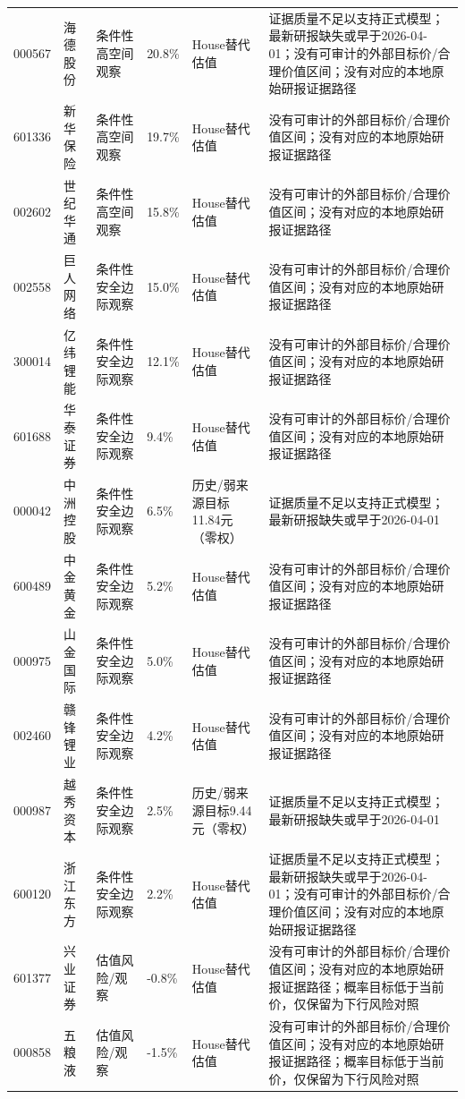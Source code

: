 \begin{longtable}{L{1.15cm}L{1.55cm}L{2.15cm}R{1.15cm}R{1.05cm}L{3.0cm}}
000567 & 海德股份 & 条件性高空间观察 & 20.8\% & House替代估值 & 证据质量不足以支持正式模型；最新研报缺失或早于2026-04-01；没有可审计的外部目标价/合理价值区间；没有对应的本地原始研报证据路径 \\
601336 & 新华保险 & 条件性高空间观察 & 19.7\% & House替代估值 & 没有可审计的外部目标价/合理价值区间；没有对应的本地原始研报证据路径 \\
002602 & 世纪华通 & 条件性高空间观察 & 15.8\% & House替代估值 & 没有可审计的外部目标价/合理价值区间；没有对应的本地原始研报证据路径 \\
002558 & 巨人网络 & 条件性安全边际观察 & 15.0\% & House替代估值 & 没有可审计的外部目标价/合理价值区间；没有对应的本地原始研报证据路径 \\
300014 & 亿纬锂能 & 条件性安全边际观察 & 12.1\% & House替代估值 & 没有可审计的外部目标价/合理价值区间；没有对应的本地原始研报证据路径 \\
601688 & 华泰证券 & 条件性安全边际观察 & 9.4\% & House替代估值 & 没有可审计的外部目标价/合理价值区间；没有对应的本地原始研报证据路径 \\
000042 & 中洲控股 & 条件性安全边际观察 & 6.5\% & 历史/弱来源目标11.84元（零权） & 证据质量不足以支持正式模型；最新研报缺失或早于2026-04-01 \\
600489 & 中金黄金 & 条件性安全边际观察 & 5.2\% & House替代估值 & 没有可审计的外部目标价/合理价值区间；没有对应的本地原始研报证据路径 \\
000975 & 山金国际 & 条件性安全边际观察 & 5.0\% & House替代估值 & 没有可审计的外部目标价/合理价值区间；没有对应的本地原始研报证据路径 \\
002460 & 赣锋锂业 & 条件性安全边际观察 & 4.2\% & House替代估值 & 没有可审计的外部目标价/合理价值区间；没有对应的本地原始研报证据路径 \\
000987 & 越秀资本 & 条件性安全边际观察 & 2.5\% & 历史/弱来源目标9.44元（零权） & 证据质量不足以支持正式模型；最新研报缺失或早于2026-04-01 \\
600120 & 浙江东方 & 条件性安全边际观察 & 2.2\% & House替代估值 & 证据质量不足以支持正式模型；最新研报缺失或早于2026-04-01；没有可审计的外部目标价/合理价值区间；没有对应的本地原始研报证据路径 \\
601377 & 兴业证券 & 估值风险/观察 & -0.8\% & House替代估值 & 没有可审计的外部目标价/合理价值区间；没有对应的本地原始研报证据路径；概率目标低于当前价，仅保留为下行风险对照 \\
000858 & 五粮液 & 估值风险/观察 & -1.5\% & House替代估值 & 没有可审计的外部目标价/合理价值区间；没有对应的本地原始研报证据路径；概率目标低于当前价，仅保留为下行风险对照 \\

\end{longtable}
